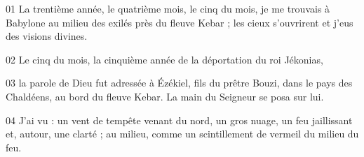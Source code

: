 01 La trentième année, le quatrième mois, le cinq du mois, je me trouvais à Babylone au milieu des exilés près du fleuve Kebar ; les cieux s’ouvrirent et j’eus des visions divines.

02 Le cinq du mois, la cinquième année de la déportation du roi Jékonias,

03 la parole de Dieu fut adressée à Ézékiel, fils du prêtre Bouzi, dans le pays des Chaldéens, au bord du fleuve Kebar. La main du Seigneur se posa sur lui.

04 J’ai vu : un vent de tempête venant du nord, un gros nuage, un feu jaillissant et, autour, une clarté ; au milieu, comme un scintillement de vermeil du milieu du feu.
